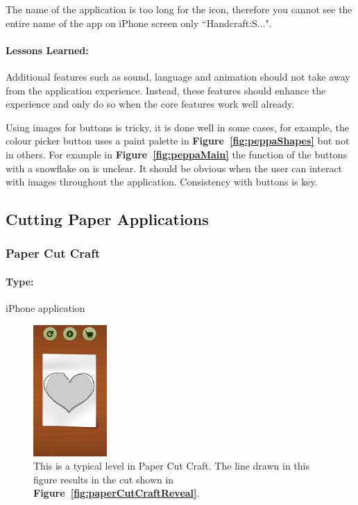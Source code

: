 \documentclass[11pt]{article}
\begin{document}
                The name of the application is too long for the icon, therefore you cannot see the entire name of the app on iPhone screen only ``Handcraft:S...".
                
                \paragraph{Lessons Learned:}   
                Additional features such as sound, language and animation should not take away from the application experience. Instead, these features should enhance the experience and only do so when the core features work well already. 
                
                Using images for buttons is tricky, it is done well in some cases, for example, the colour picker button uses a paint palette in \textbf{Figure~\ref{fig:peppaShapes}} but not in others. For example in \textbf{Figure~\ref{fig:peppaMain}} the function of the buttons with a snowflake on is unclear. It should be obvious when the user can interact with images throughout the application. Consistency with buttons is key.
                
        \subsection{Cutting Paper Applications}
            \subsubsection{Paper Cut Craft}
            
                \paragraph{Type:} iPhone application \cite{PaperCutCraft}
                 
                 \begin{figure}
                    \includegraphics[width=0.25\textwidth]{Images/paperCutCraftCut.png}
                    \caption{This is a typical level in Paper Cut Craft. The line drawn in this figure results in the cut shown in \textbf{Figure~\ref{fig:paperCutCraftReveal}}.}
                    \label{fig:paperCutCraftCut}
                \end{figure}
                
\end{document}
